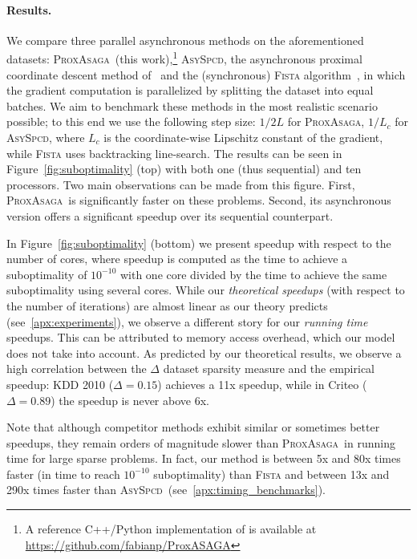 \documentclass{article}
\newcommand{\PASAGA}{\textsc{ProxAsaga}}
\newcommand{\AsySPCD}{\textsc{AsySpcd}}
\begin{document}
\paragraph{Results.} We compare three parallel asynchronous methods on the aforementioned datasets: \PASAGA\ (this work),\footnote{A reference C++/Python implementation of is available at \url{https://github.com/fabianp/ProxASAGA}} \AsySPCD, the asynchronous proximal coordinate descent method of~\citet{liu2015asynchronous2} and the (synchronous) \textsc{Fista} algorithm~\citep{beck2009gradient}, in which the gradient computation is parallelized by splitting the dataset into equal batches.
We aim to benchmark these methods in the most realistic scenario possible; to this end we use the following step size: $1 / 2L$ for \PASAGA, $1/L_c$ for \AsySPCD, where $L_c$ is the coordinate-wise Lipschitz constant of the gradient, while \textsc{Fista} uses backtracking line-search.
The results can be seen in Figure~\ref{fig:suboptimality} (top) with both one (thus sequential) and ten processors.
Two main observations can be made from this figure. First, \PASAGA\ is significantly faster on these problems. Second, its asynchronous version offers a significant speedup over its sequential counterpart.

In Figure~\ref{fig:suboptimality} (bottom) we present speedup with respect to the number of cores, where speedup is computed as the time to achieve a suboptimality of $10^{-10}$ with one core divided by the time to achieve the same suboptimality using several cores.
%
While our \emph{theoretical speedups} (with respect to the number of iterations) are almost linear as our theory predicts (see~\ref{apx:experiments}),  we observe a different story for our \emph{running time} speedups.
This can be attributed to memory access overhead, which our model does not take into account.
As predicted by our theoretical results, we observe a high correlation between the $\Delta$ dataset sparsity measure and the empirical speedup: KDD 2010 ($\Delta=0.15$) achieves a 11x speedup, while in Criteo ($\Delta=0.89$) the speedup is never above 6x.


Note that although competitor methods exhibit similar or sometimes better speedups, they remain orders of magnitude slower than \PASAGA\ in running time for large sparse problems. In fact, our method is between 5x and 80x times faster (in time to reach $10^{-10}$ suboptimality) than \textsc{Fista} and between 13x and 290x times faster  than \AsySPCD\ (see~\ref{apx:timing_benchmarks}).
\end{document}
